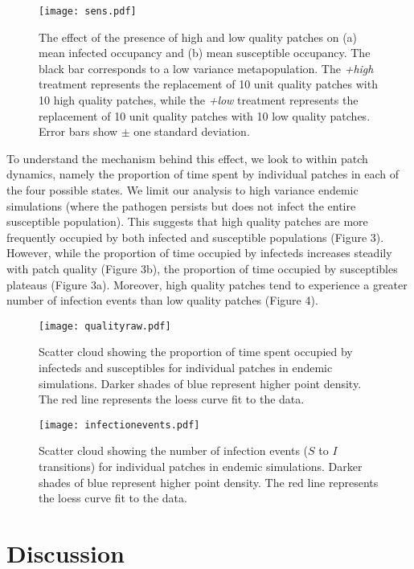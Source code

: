 \documentclass{svjour3}
\begin{document}
\begin{figure}
\label{sens}
\centering
\texttt{[image: sens.pdf]}
\caption{The effect of the presence of high and low quality patches on (a) mean infected occupancy and (b) mean susceptible occupancy. The black bar corresponds to a low variance metapopulation.  The \textit{+high} treatment represents the replacement of 10 unit quality patches with 10 high quality patches, while the \textit{+low} treatment represents the replacement of 10 unit quality patches with 10 low quality patches.  Error bars show $\pm$ one standard deviation.}
\end{figure}

To understand the mechanism behind this effect, we look to within patch dynamics, namely the proportion of time spent by individual patches in each of the four possible states.  We limit our analysis to high variance endemic simulations (where the pathogen persists but does not infect the entire susceptible population).  This suggests that high quality patches are more frequently occupied by both infected and susceptible populations (Figure 3).  However, while the proportion of time occupied by infecteds increases steadily with patch quality (Figure 3b), the proportion of time occupied by susceptibles plateaus (Figure 3a).  Moreover, high quality patches tend to experience a greater number of infection events than low quality patches (Figure 4).

\begin{figure}
\label{qualityraw}
\centering
\texttt{[image: qualityraw.pdf]}
\caption{Scatter cloud showing the proportion of time spent occupied by infecteds and susceptibles for individual patches in endemic simulations. Darker shades of blue represent higher point density. The red line represents the loess curve fit to the data.}
\end{figure}

\begin{figure}
\label{infections}
\centering
\texttt{[image: infectionevents.pdf]}
\caption{Scatter cloud showing the number of infection events ($S$ to $I$ transitions) for individual patches in endemic simulations. Darker shades of blue represent higher point density. The red line represents the loess curve fit to the data.}
\end{figure}

\section{Discussion}
\label{discussion}
\end{document}
